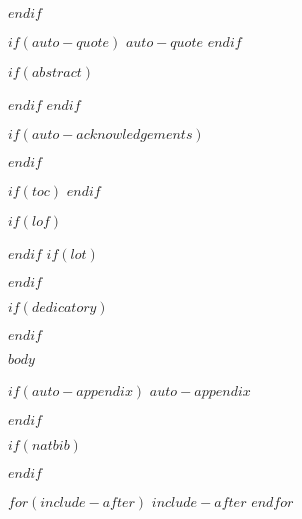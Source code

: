 \documentclass[oneside,$if(fontsize)$$fontsize$,$endif$$if(lang)$$babel-lang$,$endif$$if(papersize)$$papersize$paper,$endif$$if(beamer)$ignorenonframetext,$if(handout)$handout,$endif$$if(aspectratio)$aspectratio=$aspectratio$,$endif$$endif$$for(classoption)$$classoption$$sep$,$endfor$]{Thesis}
\begin{document}
  $endif$

\pagestyle{empty}

\null\vfill

  $if(auto-quote)$
    $auto-quote$
\vfill\vfill\vfill\vfill\vfill\vfill\null
\clearpage
  $endif$

  $if(abstract)$


\clearpage
  $endif$
$endif$

$if(auto-acknowledgements)$

\clearpage
$endif$

\pagestyle{fancy}
$if(toc)$
\tableofcontents
$endif$

$if(lof)$
  \listoffigures
$endif$
$if(lot)$
  \listoftables
$endif$

$if(dedicatory)$

\pagestyle{empty}


$endif$

\mainmatter

\fancyhf{}
\fancyhead[LO]{\leftmark}
\fancyhead[RE]{\rightmark}
\fancyhead[LE,RO]{\thepage}
\pagestyle{fancy}

$body$

$if(auto-appendix)$
\appendix
  $auto-appendix$
$endif$

\backmatter

\label{Bibliography}


$if(natbib)$
  
$endif$




$for(include-after)$
  $include-after$
$endfor$
\end{document}
